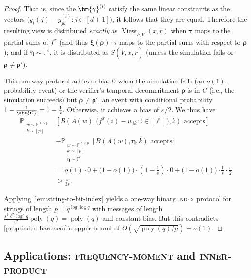 \documentclass[10pt,a4paper]{article}
\theoremstyle{definition}
\DeclareMathOperator{\view}{View}
\newcommand{\field}{\mathbb{F}}
\renewcommand{\P}{\mathbb P}
\newcommand{\poly}{\operatorname{poly}}
\newcommand{\eps}{\varepsilon}
\newcommand{\indexproblem}{\normalfont\textsc{index}\xspace}
\newcommand{\frequencymoment}{\normalfont\textsc{frequency-moment}\xspace}
\newcommand{\innerproductproblem}{\normalfont\textsc{inner-product}\xspace}
\newcommand{\pcommitlength}{p}
\newcommand{\pcommitstring}{y}
\newcommand{\degree}{d}
\newcommand{\fieldsize}{q}
\newcommand{\fingerprinttuple}{\bm{\rho}}
\def\fe#1{
    \ifnum#1=1
        \alpha
    \else
    \ifnum#1=2
        \beta
    \else
    \ifnum#1=3
        \gamma
    \fi\fi\fi
}
\begin{document}
\begin{proof}
     That is, since the $\bm{\fe3}^{(i)}$ satisfy the same linear constraints as the vectors $\big(g_i(j) - \pcommitstring^{(i)}_{jk} : j \in [\degree + 1]\big)$, it follows that they are equal. Therefore the resulting view is distributed \emph{exactly} as $\view_{P, \widetilde V}(x, r)$ when $\bm{\tau}$ maps to the partial sums of $f^x$ (and thus $\bm{\xi}(\fingerprinttuple) \cdot \tau$ maps to the partial sums with respect to $\fingerprinttuple$); and if $\bm{\eta} \sim \field^{\ell}$, it is distributed as $S(\widetilde V, x, r)$ (unless the simulation fails or $\fingerprinttuple \neq \fingerprinttuple'$).

    This one-way protocol achieves bias $0$ when the simulation fails (an $o(1)$-probability event) or the verifier's temporal decommitment $\fingerprinttuple$ is in $C$ (i.e., the simulation succeeds) but $\fingerprinttuple  \neq \fingerprinttuple'$, an event with conditional probability $1 -\frac1{\abs{C}} = 1 - \frac1{s}$. Otherwise, it achieves a bias of $\eps/2$. We thus have
    \begin{align*}
        \P_{\substack{w \sim \field^{\ell \times \pcommitlength}\\k \sim [\pcommitlength]}}&\left[B\left(A(w), \big(f^x(i) - w_{ik} : i \in [\ell]\big), k\right)\text{ accepts}\right]\\
        &- \P_{\substack{w \sim \field^{\ell \times \pcommitlength}\\k \sim [\pcommitlength]\\\bm{\eta} \sim \field^\ell}}\left[B\left(A(w), \bm{\eta}, k\right)\text{ accepts}\right]\\
        &= o(1) \cdot 0 + \big(1 - o(1)\big) \cdot \left(1 - \frac1 s\right) \cdot 0 + \big(1 - o(1)\big) \cdot \frac1 s \cdot \frac{\eps}{2}\\
        &\geq \frac{\eps}{3s}.
    \end{align*}

    Applying \cref{lem:string-to-bit-index} yields a one-way binary \indexproblem protocol for strings of length $\pcommitlength = \fieldsize^{\log\log \fieldsize} $ with messages of length $\frac{s^2 \ell^2 \log^2 \fieldsize}{\eps^2} \poly(\fieldsize) = \poly(\fieldsize)$ and constant bias. But this contradicts \cref{prop:index-hardness}'s upper bound of $O\left(\sqrt{\poly(\fieldsize)/\pcommitlength}\right) = o(1)$.
\end{proof}

\subsection{Applications: \frequencymoment and \innerproductproblem}
\label{sec:sumcheck-applications}
\end{document}
